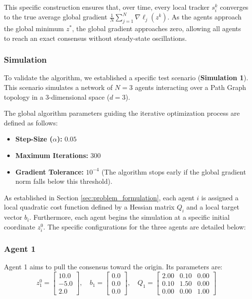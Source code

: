 \documentclass[11pt, a4paper]{article}
\begin{document}
This specific construction ensures that, over time, every local tracker $s_i^k$ converges to the true average global gradient $\frac{1}{N} \sum_{j=1}^N \nabla \ell_j(z^k)$. As the agents approach the global minimum $z^*$, the global gradient approaches zero, allowing all agents to reach an exact consensus without steady-state oscillations.

\subsubsection{Simulation}
\label{sec:simulation_inputs}

To validate the algorithm, we established a specific test scenario (\textbf{Simulation 1}). This scenario simulates a network of $N = 3$ agents interacting over a Path Graph topology in a 3-dimensional space ($d = 3$). 

The global algorithm parameters guiding the iterative optimization process are defined as follows:
\begin{itemize}
    \item \textbf{Step-Size ($\alpha$):} $0.05$
    \item \textbf{Maximum Iterations:} $300$
    \item \textbf{Gradient Tolerance:} $10^{-4}$ (The algorithm stops early if the global gradient norm falls below this threshold).
\end{itemize}

As established in Section \ref{sec:problem_formulation}, each agent $i$ is assigned a local quadratic cost function defined by a Hessian matrix $Q_i$ and a local target vector $b_i$. Furthermore, each agent begins the simulation at a specific initial coordinate $z_i^0$. The specific configurations for the three agents are detailed below:

\subsubsection*{Agent 1}
Agent 1 aims to pull the consensus toward the origin. Its parameters are:
$$
z_1^0 = \begin{bmatrix} 10.0 \\ -5.0 \\ 2.0 \end{bmatrix}, \quad
b_1 = \begin{bmatrix} 0.0 \\ 0.0 \\ 0.0 \end{bmatrix}, \quad
Q_1 = \begin{bmatrix} 
2.00 & 0.10 & 0.00 \\ 
0.10 & 1.50 & 0.00 \\ 
0.00 & 0.00 & 1.00 
\end{bmatrix}
$$
\end{document}
